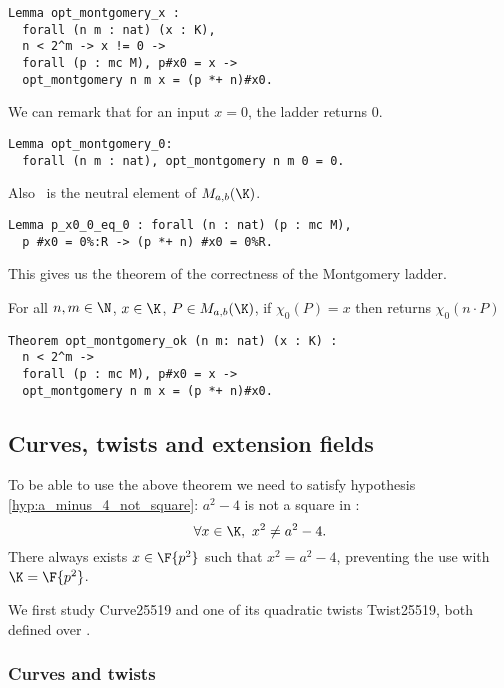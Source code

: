 \begin{lstlisting}[language=Coq]
Lemma opt_montgomery_x :
  forall (n m : nat) (x : K),
  n < 2^m -> x != 0 ->
  forall (p : mc M), p#x0 = x ->
  opt_montgomery n m x = (p *+ n)#x0.
\end{lstlisting}
We can remark that for an input $x = 0$, the ladder returns $0$.
\begin{lstlisting}[language=Coq]
Lemma opt_montgomery_0:
  forall (n m : nat), opt_montgomery n m 0 = 0.
\end{lstlisting}
Also \Oinf\ is the neutral element of $M_{a,b}(\K)$.
\begin{lstlisting}[language=Coq]
Lemma p_x0_0_eq_0 : forall (n : nat) (p : mc M),
  p #x0 = 0%:R -> (p *+ n) #x0 = 0%R.
\end{lstlisting}
This gives us the theorem of the correctness of the Montgomery ladder.
\begin{theorem}
\label{thm:montgomery-ladder-correct}
For all $n, m \in \N$, $x \in \K$, $P \in M_{a,b}(\K)$,
if $\chi_0(P) = x$ then  returns $\chi_0(n \cdot P)$
\end{theorem}
\begin{lstlisting}[language=Coq]
Theorem opt_montgomery_ok (n m: nat) (x : K) :
  n < 2^m ->
  forall (p : mc M), p#x0 = x ->
  opt_montgomery n m x = (p *+ n)#x0.
\end{lstlisting}

\subsection{Curves, twists and extension fields}

To be able to use the above theorem we need to satisfy hypothesis
\ref{hyp:a_minus_4_not_square}: $a^2-4$ is not a square in \K:
$$\forall x \in \K,\ x^2 \neq a^2-4.$$
There always exists $x \in \F{p^2}$ such that $x^2 = a^2-4$,
preventing the use 
with $\K = \F{p^2}$.

We first study Curve25519 and one of its quadratic twists Twist25519, both defined
over .

\subsubsection{Curves and twists}
\label{subsec:Zmodp}


